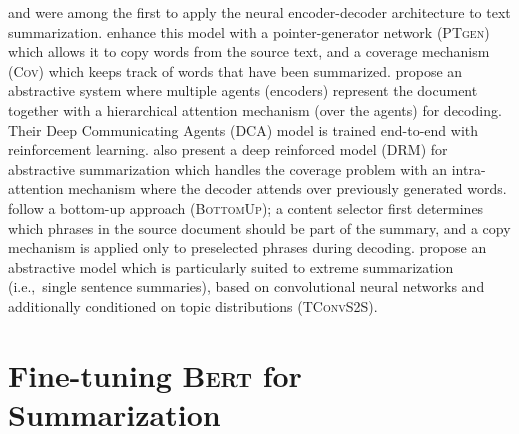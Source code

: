 \documentclass[11pt,a4paper]{article}
\begin{document}
    
    
    \citet{rush2015neural} and \citet{nallapati2016abstractive} were among
    the first to apply the neural encoder-decoder architecture to text
    summarization.  \citet{see-acl17} enhance this model with a
    pointer-generator network (\textsc{PTgen}) which allows it to copy words
    from the source text, and a coverage mechanism (\textsc{Cov}) which
    keeps track of words that have been summarized.  
    \citet{celikyilmaz2018deep} propose an abstractive system where
    multiple agents (encoders) represent the document together with a
    hierarchical attention mechanism (over the agents) for decoding.
    Their Deep Communicating Agents (\textsc{DCA}) model is trained
    end-to-end with reinforcement learning. \citet{paulus2017deep} also
    present a deep reinforced model (\textsc{DRM}) for abstractive
    summarization which handles the coverage problem with an
    intra-attention mechanism where the decoder attends over previously
    generated words. \citet{gehrmann2018bottom} follow a bottom-up
    approach (\textsc{BottomUp}); a content selector first determines
    which phrases in the source document should be part of the summary, and
    a copy mechanism is applied only to preselected phrases during
    decoding.  \citet{xsum} propose an abstractive model which is
    particularly suited to extreme summarization (i.e.,~single sentence
    summaries), based on convolutional neural networks and additionally
    conditioned on topic distributions (\textsc{TConvS2S}).
    
    
    
    
    \section{Fine-tuning \textsc{Bert} for Summarization}
    \label{sec:fine-tuning-textscb}
    
\end{document}
